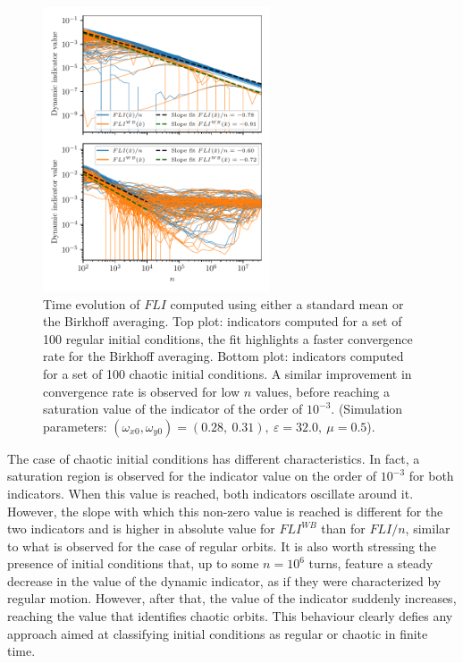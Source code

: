 \begin{figure}[htp]
    \centering
    \includegraphics[width=0.6\textwidth]{6_dynamic_indicators/fig/lyap_birkhoff.pdf}
    \caption{Time evolution of $FLI$ computed using either a standard mean or the Birkhoff averaging. Top plot: indicators computed for a set of 100 regular initial conditions, the fit highlights a faster convergence rate for the Birkhoff averaging. Bottom plot: indicators computed for a set of 100 chaotic initial conditions. A similar improvement in convergence rate is observed for low $n$ values, before reaching a saturation value of the indicator of the order of $10^{-3}$. (Simulation parameters: $(\omega_{x0},\omega_{y0})= (0.28,\ 0.31),\ \varepsilon=32.0,\ \mu=0.5$).}
    \label{fig:fli_compare_mean_birk}
\end{figure}

The case of chaotic initial conditions has different characteristics. In fact, a saturation region is observed for the indicator value on the order of $10^{-3}$ for both indicators. When this value is reached, both indicators oscillate around it. However, the slope with which this non-zero value is reached is different for the two indicators and is higher in absolute value for $FLI^{WB}$ than for $FLI/n$, similar to what is observed for the case of regular orbits. It is also worth stressing the presence of initial conditions that, up to some $n=10^6$ turns, feature a steady decrease in the value of the dynamic indicator, as if they were characterized by regular motion. However, after that, the value of the indicator suddenly increases, reaching the value that identifies chaotic orbits. This behaviour clearly defies any approach aimed at classifying initial conditions as regular or chaotic in finite time. 

